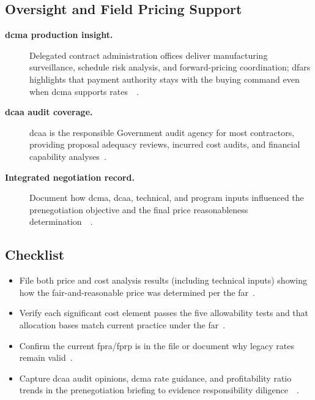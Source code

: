\documentclass[../main.tex]{subfiles}
\begin{document}
\subsection{Oversight and Field Pricing Support}
\begin{description}
\item[\textbf{\ac{dcma} production insight.}] Delegated contract administration offices deliver manufacturing surveillance, schedule risk analysis, and forward-pricing coordination; \ac{dfars} highlights that payment authority stays with the buying command even when \ac{dcma} supports rates~\autocite[\S~242.302(a)(13)(A)]{DFARS}~\autocite{edo-3-2-4-cost-price-evaluation-2024}.
  \item[\textbf{\ac{dcaa} audit coverage.}] \ac{dcaa} is the responsible Government audit agency for most contractors, providing proposal adequacy reviews, incurred cost audits, and financial capability analyses~\autocite[\S~42.101(b)]{FAR}.
  \item[\textbf{Integrated negotiation record.}] Document how \ac{dcma}, \ac{dcaa}, technical, and program inputs influenced the prenegotiation objective and the final price reasonableness determination~\autocite[\S~15.404-1(a)(5)]{FAR}~\autocite{edo-3-2-4-cost-price-evaluation-2024}.
\end{description}

\subsection{Checklist}
\begin{itemize}
  \item File both price and cost analysis results (including technical inputs) showing how the fair-and-reasonable price was determined per the \ac{far}~\autocite[\S~15.404-1]{FAR}.
  \item Verify each significant cost element passes the five allowability tests and that allocation bases match current practice under the \ac{far}~\autocite[\S\S~31.201-2, 31.203]{FAR}.
  \item Confirm the current \ac{fpra}/\ac{fprp} is in the file or document why legacy rates remain valid~\autocite[\S~15.407-3]{FAR}.
  \item Capture \ac{dcaa} audit opinions, \ac{dcma} rate guidance, and profitability ratio trends in the prenegotiation briefing to evidence responsibility diligence~\autocite[\S\S~9.104-1, 42.101(b)]{FAR}~\autocite{edo-3-2-4-cost-price-evaluation-2024}.
\end{itemize}

\end{document}
